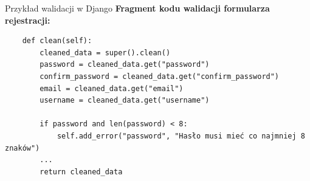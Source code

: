 \documentclass[polish,aspectratio=1610]{beamer}
\begin{document}
    \begin{frame}[fragile]{Przykład walidacji w Django}
        \textbf{Fragment kodu walidacji formularza rejestracji:}
        \begin{verbatim}
    def clean(self):
        cleaned_data = super().clean()
        password = cleaned_data.get("password")
        confirm_password = cleaned_data.get("confirm_password")
        email = cleaned_data.get("email")
        username = cleaned_data.get("username")

        if password and len(password) < 8:
            self.add_error("password", "Hasło musi mieć co najmniej 8 znaków")
        ...
        return cleaned_data
        \end{verbatim}
    \end{frame}
\end{document}
